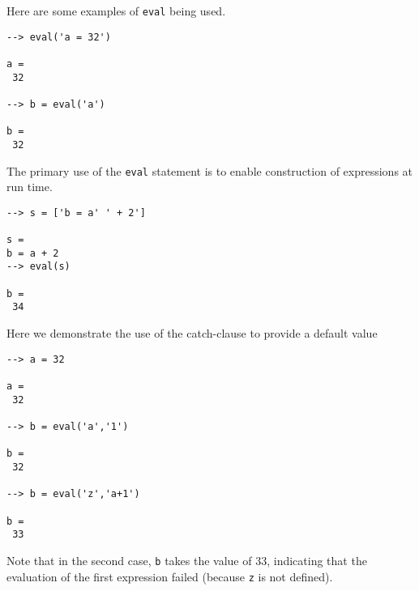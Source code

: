 Here are some examples of \verb|eval| being used.
\begin{verbatim}
--> eval('a = 32')

a = 
 32 

--> b = eval('a')

b = 
 32 
\end{verbatim}
The primary use of the \verb|eval| statement is to enable construction
of expressions at run time.
\begin{verbatim}
--> s = ['b = a' ' + 2']

s = 
b = a + 2
--> eval(s)

b = 
 34 
\end{verbatim}
Here we demonstrate the use of the catch-clause to provide a 
default value
\begin{verbatim}
--> a = 32

a = 
 32 

--> b = eval('a','1')

b = 
 32 

--> b = eval('z','a+1')

b = 
 33 
\end{verbatim}
Note that in the second case, \verb|b| takes the value of 33, indicating
that the evaluation of the first expression failed (because \verb|z| is
not defined).
